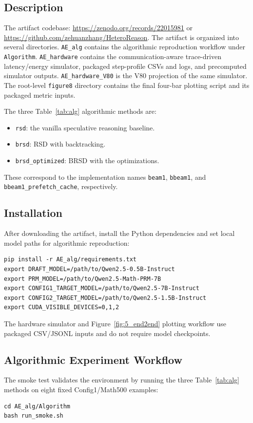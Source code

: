 \subsection{Description}
The artifact codebase: \url{https://zenodo.org/records/22015981} or \url{https://github.com/zehuanzhang/HeteroReason}.
The artifact is organized into several directories. \texttt{AE\_alg}
contains the algorithmic reproduction workflow under \texttt{Algorithm}.
\texttt{AE\_hardware} contains the communication-aware trace-driven
latency/energy simulator, packaged step-profile CSVs and logs, and precomputed
simulator outputs. \texttt{AE\_hardware\_V80} is the V80 projection of the
same simulator. The root-level \texttt{figure8} directory contains the final
four-bar plotting script and its packaged metric inputs.

The three Table~\ref{tab:alg} algorithmic methods are:
\begin{itemize}[leftmargin=*, itemsep=1pt]
  \item \texttt{rsd}: the vanilla speculative reasoning baseline.
  \item \texttt{brsd}: RSD with backtracking.
  \item \texttt{brsd\_optimized}: BRSD with the optimizations.
\end{itemize}
These correspond to the implementation names \texttt{beam1},
\texttt{bbeam1}, and \texttt{bbeam1\_prefetch\_cache}, respectively.

\subsection{Installation}
After downloading the artifact, install the Python dependencies and set local
model paths for algorithmic reproduction:
{\footnotesize
\begin{verbatim}
pip install -r AE_alg/requirements.txt
export DRAFT_MODEL=/path/to/Qwen2.5-0.5B-Instruct
export PRM_MODEL=/path/to/Qwen2.5-Math-PRM-7B
export CONFIG1_TARGET_MODEL=/path/to/Qwen2.5-7B-Instruct
export CONFIG2_TARGET_MODEL=/path/to/Qwen2.5-1.5B-Instruct
export CUDA_VISIBLE_DEVICES=0,1,2
\end{verbatim}
}
The hardware simulator and Figure~\ref{fig:5_end2end} plotting workflow use packaged CSV/JSONL
inputs and do not require model checkpoints.

\subsection{Algorithmic Experiment Workflow}
The smoke test validates the environment by running the three Table~\ref{tab:alg} methods
on eight fixed Config1/Math500 examples:
\begin{verbatim}
cd AE_alg/Algorithm
bash run_smoke.sh
\end{verbatim}

